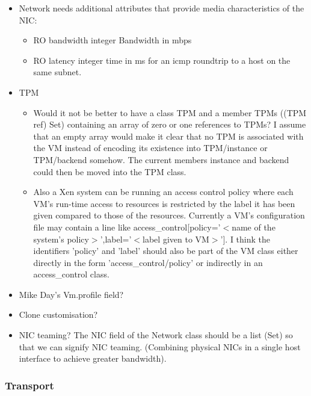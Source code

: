 \begin{itemize}
\item Network needs additional attributes that provide media characteristics
of the NIC:

\begin{itemize}

\item RO bandwidth integer Bandwidth in mbps
\item RO latency integer time in ms for an icmp roundtrip to a host on the
same subnet.

\end{itemize}

\item TPM
\begin{itemize}

\item Would it not be better to have a class TPM and a member TPMs ((TPM ref)
Set) containing an array of zero or one references to TPMs? I assume that
an empty array would make it clear that no TPM is associated with the VM
instead of encoding its existence into TPM/instance or TPM/backend
somehow. The current members instance and backend could then be moved into
the TPM class.

\item Also a Xen system can be running an access control policy where each
VM's run-time access to resources is restricted by the label it has been given
compared to those of the resources. Currently a VM's configuration file may
contain a line like access\_control[policy='$<$name of the system's
policy$>$',label='$<$label given to VM$>$'].  I think the identifiers 'policy'
and 'label' should also be part of the VM class either directly in the form
'access\_control/policy' or indirectly in an access\_control class.

\end{itemize}

\item Mike Day's Vm.profile field?

\item Clone customisation?

\item NIC teaming?  The NIC field of the Network class should be a list (Set)
so that we can signify NIC teaming. (Combining physical NICs in a single host
interface to achieve greater bandwidth).

\end{itemize}

\subsubsection{Transport}

